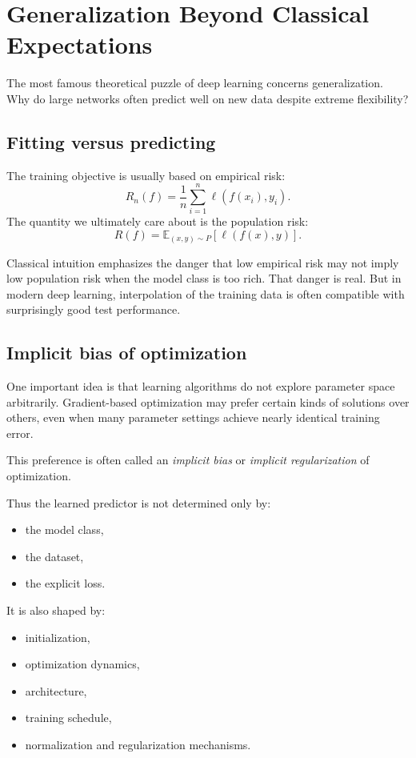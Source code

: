 \section{Generalization Beyond Classical Expectations}

The most famous theoretical puzzle of deep learning concerns generalization.
Why do large networks often predict well on new data despite extreme flexibility?

\subsection*{Fitting versus predicting}

The training objective is usually based on empirical risk:
\[
\widehat{R}_n(f)
=
\frac{1}{n}\sum_{i=1}^n \ell(f(x_i),y_i).
\]
The quantity we ultimately care about is the population risk:
\[
R(f)=\mathbb{E}_{(x,y)\sim P}[\ell(f(x),y)].
\]

\medskip

Classical intuition emphasizes the danger that low empirical risk may not imply low population risk when the model class is too rich.
That danger is real.
But in modern deep learning, interpolation of the training data is often compatible with surprisingly good test performance.

\subsection*{Implicit bias of optimization}

One important idea is that learning algorithms do not explore parameter space arbitrarily.
Gradient-based optimization may prefer certain kinds of solutions over others, even when many parameter settings achieve nearly identical training error.

\medskip

This preference is often called an \emph{implicit bias} or \emph{implicit regularization} of optimization.

\medskip

Thus the learned predictor is not determined only by:
\begin{itemize}
    \item the model class,
    \item the dataset,
    \item the explicit loss.
\end{itemize}
It is also shaped by:
\begin{itemize}
    \item initialization,
    \item optimization dynamics,
    \item architecture,
    \item training schedule,
    \item normalization and regularization mechanisms.
\end{itemize}

